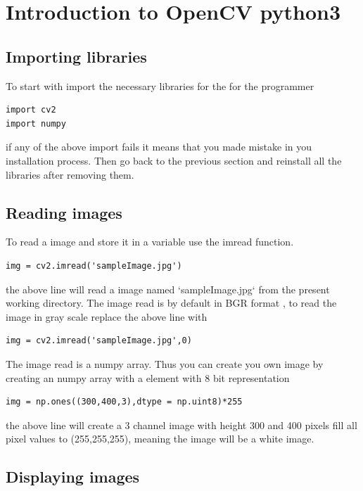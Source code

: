 \documentclass[11pt]{article}
\begin{document}
\section{Introduction to OpenCV python3}
\label{sec-7}
\subsection*{Importing libraries}
\label{sec-7-1}
To start with import the necessary libraries for the for the programmer  
\begin{verbatim}
import cv2
import numpy
\end{verbatim}
if any of the above import fails it means that you made mistake in you installation  
process. Then go back to the previous section and reinstall all the libraries after  
removing them.  
\subsection*{Reading images}
\label{sec-7-2}
To read a image and store it in a variable use the imread function.  
\begin{verbatim}
img = cv2.imread('sampleImage.jpg')
\end{verbatim}
the above line will read a image named `sampleImage.jpg` from the present working directory.  
The image read is by default in BGR format , to read the image in gray scale replace the above  
line with  
\begin{verbatim}
img = cv2.imread('sampleImage.jpg',0)
\end{verbatim}
The image read is a numpy array. Thus you can create you own image by creating an numpy array  
with a element with 8 bit representation  
\begin{verbatim}
img = np.ones((300,400,3),dtype = np.uint8)*255
\end{verbatim}
the above line will create a 3 channel image with height 300 and 400 pixels fill all pixel values  
to (255,255,255), meaning the image will be a white image.  
\subsection*{Displaying images}
\label{sec-7-3}
\end{document}
